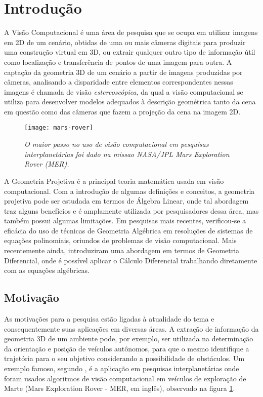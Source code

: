 \section{Introdução}
A Visão Computacional é uma área de pesquisa que se ocupa em utilizar imagens em 2D de um cenário, obtidas de uma ou mais câmeras digitais para produzir uma construção virtual em 3D, ou extrair qualquer outro tipo de informação útil como localização e transferência de pontos de uma imagem para outra. A captação da geometria 3D de um cenário a partir de imagens produzidas por câmeras, analisando a disparidade entre elementos correspondentes nessas imagens é chamada de visão {\it estereoscópica}, da qual a visão computacional se utiliza para desenvolver modelos adequados à descrição geométrica tanto da cena em questão como das câmeras que fazem a projeção da cena na imagem 2D.  

\begin{figure}[!htb]
\centering
\texttt{[image: mars-rover]}
\caption{{\it O maior passo no uso de visão computacional em pesquisas interplanetárias foi dado na missao NASA/JPL Mars Exploration Rover (MER).}}
\label{fig.mars-rover}
\end{figure}

A Geometria Projetiva é a principal teoria matemática usada em visão computacional. Com a introdução de algumas definições e conceitos, a geometria projetiva pode ser estudada em termos de Álgebra Linear, onde tal abordagem traz alguns benefícios e é amplamente utilizada por pesquisadores dessa área, mas também possui algumas limitações. Em pesquisas mais recentes, verificou-se a eficácia do uso de técnicas de Geometria Algébrica em resoluções de sistemas de equações polinomiais, oriundos de problemas de visão computacional. Mais recentemente ainda, \citep{tese-fabbri} introduziram uma abordagem em termos de Geometria Diferencial, onde é possível aplicar o Cálculo Diferencial trabalhando diretamente com as equações algébricas.


\subsection{Motivação}
As motivações para a pesquisa estão ligadas à atualidade do tema e consequentemente suas aplicações em diversas áreas. A extração de informação da geometria 3D de um ambiente pode, por exemplo, ser utilizada na determinação da orientação e posição de veículos autônomos, para que o mesmo identifique a trajetória para o seu objetivo considerando a possibilidade de obstáculos. Um exemplo famoso, segundo \citep{mars-rover}, é a aplicação em pesquisas interplanetárias onde foram usados algoritmos de visão computacional em veículos de exploração de Marte (Mars Exploration Rover - MER, em inglês), observado na figura \ref{fig.mars-rover}.


